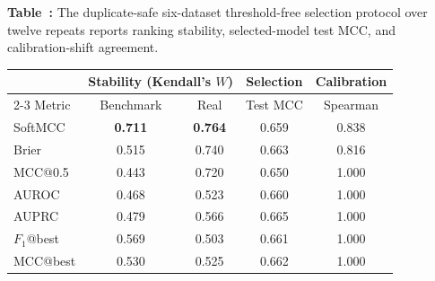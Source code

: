 \begin{center}
\label{tab:main}
\parbox{\linewidth}{\small\textbf{Table~\thetable:} The duplicate-safe six-dataset threshold-free selection protocol over twelve repeats reports ranking stability, selected-model test MCC, and calibration-shift agreement.}
\smallskip
\small
\setlength{\tabcolsep}{2.5pt}
\begin{tabular}{lcccc}
\toprule
 & \multicolumn{2}{c}{Stability (Kendall's $W$)} & Selection & Calibration\\
\cmidrule(lr){2-3}
Metric & Benchmark & Real & Test MCC & Spearman\\
\midrule
SoftMCC      & \textbf{0.711} & \textbf{0.764} & 0.659 & 0.838\\
Brier         & 0.515 & 0.740 & 0.663 & 0.816\\
MCC@0.5       & 0.443 & 0.720 & 0.650 & 1.000\\
AUROC         & 0.468 & 0.523 & 0.660 & 1.000\\
AUPRC         & 0.479 & 0.566 & 0.665 & 1.000\\
$F_1$@best    & 0.569 & 0.503 & 0.661 & 1.000\\
MCC@best      & 0.530 & 0.525 & 0.662 & 1.000\\
\bottomrule
\end{tabular}
\end{center}
